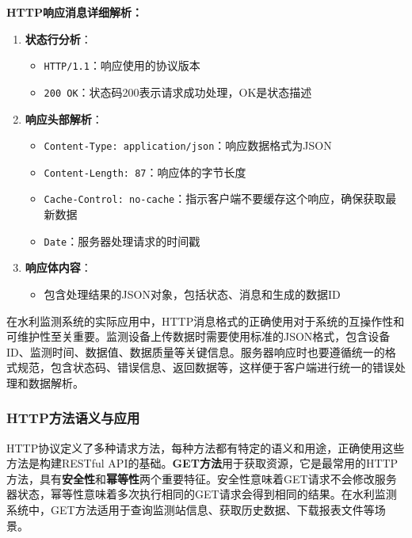 \textbf{HTTP响应消息详细解析：}

\begin{enumerate}
\def\labelenumi{\arabic{enumi}.}
\tightlist
\item
  \textbf{状态行分析}：

  \begin{itemize}
  \tightlist
  \item
    \texttt{HTTP/1.1}：响应使用的协议版本
  \item
    \texttt{200\ OK}：状态码200表示请求成功处理，OK是状态描述
  \end{itemize}
\item
  \textbf{响应头部解析}：

  \begin{itemize}
  \tightlist
  \item
    \texttt{Content-Type:\ application/json}：响应数据格式为JSON
  \item
    \texttt{Content-Length:\ 87}：响应体的字节长度
  \item
    \texttt{Cache-Control:\ no-cache}：指示客户端不要缓存这个响应，确保获取最新数据
  \item
    \texttt{Date}：服务器处理请求的时间戳
  \end{itemize}
\item
  \textbf{响应体内容}：

  \begin{itemize}
  \tightlist
  \item
    包含处理结果的JSON对象，包括状态、消息和生成的数据ID
  \end{itemize}
\end{enumerate}

在水利监测系统的实际应用中，HTTP消息格式的正确使用对于系统的互操作性和可维护性至关重要。监测设备上传数据时需要使用标准的JSON格式，包含设备ID、监测时间、数据值、数据质量等关键信息。服务器响应时也要遵循统一的格式规范，包含状态码、错误信息、返回数据等，这样便于客户端进行统一的错误处理和数据解析。

\subsubsection{HTTP方法语义与应用}\label{httpux65b9ux6cd5ux8bedux4e49ux4e0eux5e94ux7528}

HTTP协议定义了多种请求方法，每种方法都有特定的语义和用途，正确使用这些方法是构建RESTful API的基础。\textbf{GET方法}用于获取资源，它是最常用的HTTP方法，具有\textbf{安全性}和\textbf{幂等性}两个重要特征。安全性意味着GET请求不会修改服务器状态，幂等性意味着多次执行相同的GET请求会得到相同的结果。在水利监测系统中，GET方法适用于查询监测站信息、获取历史数据、下载报表文件等场景。

